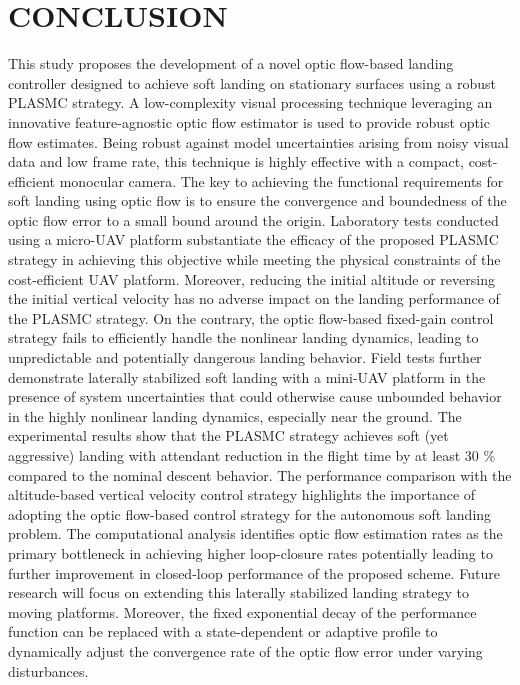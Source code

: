 \documentclass{IEEEtaes}
\begin{document}
\section{CONCLUSION}
\label{conclusion: section}
This study proposes the development of a novel optic flow-based landing controller designed to achieve soft landing on stationary surfaces using a robust PLASMC strategy. 
A low-complexity visual processing technique leveraging an innovative feature-agnostic optic flow estimator is used to provide robust optic flow estimates.
Being robust against model uncertainties arising from noisy visual data and low frame rate, this technique is highly effective with a compact, cost-efficient monocular camera. 
The key to achieving the functional requirements for soft landing using optic flow is to ensure the convergence and boundedness of the optic flow error to a small bound around the origin. 
Laboratory tests conducted using a micro-UAV platform substantiate the efficacy of the proposed PLASMC strategy in achieving this objective while meeting the physical constraints of the cost-efficient UAV platform.
Moreover, reducing the initial altitude or reversing the initial vertical velocity has no adverse impact on the landing performance of the PLASMC strategy.
On the contrary, the optic flow-based fixed-gain control strategy fails to efficiently handle the nonlinear landing dynamics, leading to unpredictable and potentially dangerous landing behavior.
Field tests further demonstrate laterally stabilized soft landing with a mini-UAV platform in the presence of system uncertainties that could otherwise cause unbounded behavior in the highly nonlinear landing dynamics, especially near the ground.
The experimental results show that the PLASMC strategy achieves soft (yet aggressive) landing with attendant reduction in the flight time by at least 30 \% compared to the nominal descent behavior.
The performance comparison with the altitude-based vertical velocity control strategy highlights the importance of adopting the optic flow-based control strategy for the autonomous soft landing problem.
The computational analysis identifies optic flow estimation rates as the primary bottleneck in achieving higher loop-closure rates potentially leading to further improvement in closed-loop performance of the proposed scheme. 
Future research will focus on extending this laterally stabilized landing strategy to moving platforms.
Moreover, the fixed exponential decay of the performance function can be replaced with a state-dependent or adaptive profile to dynamically adjust the convergence rate of the optic flow error under varying disturbances.
\end{document}
